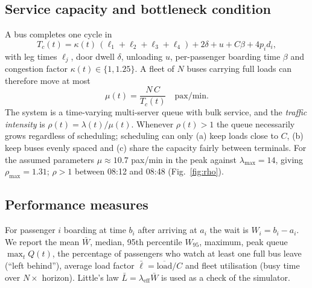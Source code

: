 \documentclass[conference]{IEEEtran}
\begin{document}
\subsection{Service capacity and bottleneck condition}
A bus completes one cycle in
\begin{equation}
T_c(t)=\kappa(t)\,(\ell_1+\ell_2+\ell_3+\ell_4)+2\delta+u+C\beta+4p_id_i,
\end{equation}
with leg times $\ell_j$, door dwell $\delta$, unloading $u$, per-passenger boarding time $\beta$ and congestion factor $\kappa(t)\in\{1,1.25\}$. A fleet of $N$ buses carrying full loads can therefore move at most
\begin{equation}
\mu(t)=\frac{N\,C}{T_c(t)}\quad\text{pax/min}.
\end{equation}
The system is a time-varying multi-server queue with bulk service, and the \emph{traffic intensity} is $\rho(t)=\lambda(t)/\mu(t)$. Whenever $\rho(t)>1$ the queue necessarily grows regardless of scheduling; scheduling can only (a) keep loads close to $C$, (b) keep buses evenly spaced and (c) share the capacity fairly between terminals. For the assumed parameters $\mu\approx 10.7$ pax/min in the peak against $\lambda_{\max}=14$, giving $\rho_{\max}=1.31$; $\rho>1$ between 08:12 and 08:48 (Fig.~\ref{fig:rho}).

\subsection{Performance measures}
For passenger $i$ boarding at time $b_i$ after arriving at $a_i$ the wait is $W_i=b_i-a_i$. We report the mean $\bar W$, median, 95th percentile $W_{95}$, maximum, peak queue $\max_t Q(t)$, the percentage of passengers who watch at least one full bus leave (``left behind''), average load factor $\bar\ell=\overline{\text{load}}/C$ and fleet utilisation (busy time over $N\times$ horizon). Little's law $\bar L=\lambda_{\text{eff}}\bar W$ is used as a check of the simulator.
\end{document}
